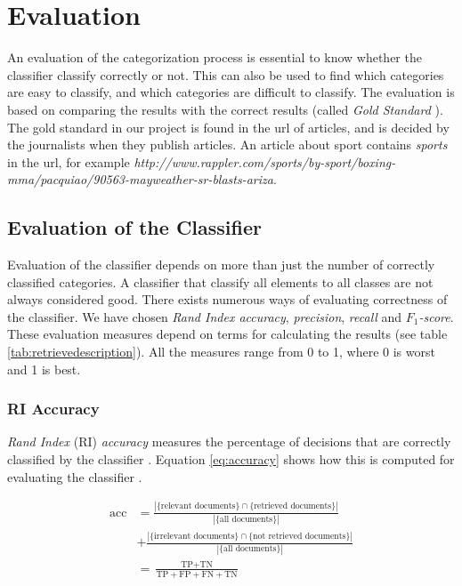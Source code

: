 
\section{Evaluation}
\label{sec:evaluation}
An evaluation of the categorization process is essential to know whether the classifier classify correctly or not. This can also be used to find which categories are easy to classify, and which categories are difficult to classify. The evaluation is based on comparing the results with the correct results (called \emph{Gold Standard} \cite[][p. 140]{iirbook}). The gold standard in our project is found in the url of articles, and is decided by the journalists when they publish articles. An article about sport contains \emph{sports} in the url, for example \emph{http://www.rappler.com/sports/by-sport/boxing-mma/pacquiao/90563-mayweather-sr-blasts-ariza}.

\subsection{Evaluation of the Classifier}
Evaluation of the classifier depends on more than just the number of correctly classified categories. A classifier that classify all elements to all classes are not always considered good. There exists numerous ways of evaluating correctness of the classifier. We have chosen \emph{Rand Index accuracy}, \emph{precision}, \emph{recall} and \emph{$F_{1}$-score}. These evaluation measures depend on terms for calculating the results (see table \ref{tab:retrievedescription}). All the measures range from 0 to 1, where 0 is worst and 1 is best.

\subsubsection{RI Accuracy}
\emph{Rand Index} (RI) \emph{accuracy} measures the percentage of decisions that are correctly classified by the classifier \cite[p:~330]{iirbook}. Equation \ref{eq:accuracy} shows how this is computed for evaluating the classifier \cite{ifi:accuracy}. 

\begin{equation} \label{eq:accuracy}
\begin{split}
\text{acc}& = \frac{|\{\text{relevant documents}\}\cap\{\text{retrieved documents}\}|}{|\{\text{all documents}\}|}\\
& + \frac{|\{\text{irrelevant documents}\}\cap\{\text{not retrieved documents}\}|}{|\{ \text{all documents}\}|}\\
& = \frac{\text{TP}+\text{TN}}{\text{TP}+\text{FP} + \text{FN} + \text{TN}}
\end{split}
\end{equation}

